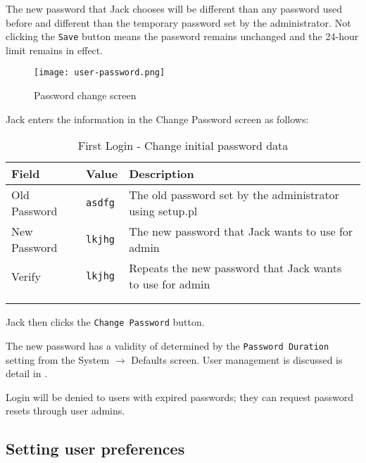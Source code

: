 The new password that Jack chooses will be different than any password used before and 
different than the temporary password set by the administrator.
Not clicking the \texttt{Save} button means the password remains unchanged and the
24-hour limit remains in effect.

\begin{figure}[H]
\centering
\texttt{[image: user-password.png]}
\caption{Password change screen}
\label{fig:first-user-password}
\end{figure}

Jack enters the information in the Change Password screen as follows:
\begin{longtable}{ llp{6cm} }
	Field & Value & Description \\ \hline
	\endhead
	Old Password & \texttt{asdfg} & The old password set by the administrator using setup.pl\\
	New Password & \texttt{lkjhg} & The new password that Jack wants to use for admin\\
	Verify & \texttt{lkjhg} &  Repeats the new password that Jack wants to use for admin\\
	\\
	\caption{First Login - Change initial password data}
	\label{fig:first-user-change-initial-password}
\end{longtable}


Jack then clicks the \texttt{Change Password} button.

The new password has a validity of determined by the \texttt{Password Duration} setting
from the System $\rightarrow$ Defaults screen. User management is discussed is detail in .

Login will be denied to users with expired passwords; they can request
password resets through user admins.

\subsection{Setting user preferences}
\label{subsec-setting-user-preferences}


